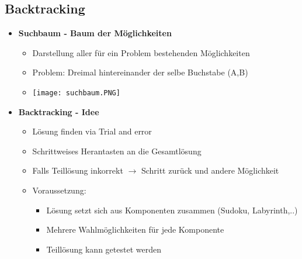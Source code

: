 \subsection{Backtracking}
    \begin{itemize}
        \item \textbf{Suchbaum - Baum der Möglichkeiten}
            \begin{itemize}
                \item Darstellung aller für ein Problem bestehenden Möglichkeiten
                \item Problem: Dreimal hintereinander der selbe Buchstabe (A,B)
                \item[] \texttt{[image: suchbaum.PNG]}
            \end{itemize}

        \item \textbf{Backtracking - Idee}
            \begin{itemize}
                \item Lösung finden via Trial and error
                \item Schrittweises Herantasten an die Gesamtlösung
                \item Falls Teillösung inkorrekt $\rightarrow$ Schritt zurück und andere Möglichkeit
                \item Voraussetzung:
                    \begin{itemize}
                        \item Lösung setzt sich aus Komponenten zusammen (Sudoku, Labyrinth,..)
                        \item Mehrere Wahlmöglichkeiten für jede Komponente
                        \item Teillösung kann getestet werden
                    \end{itemize}
            \end{itemize}


\end{itemize}
